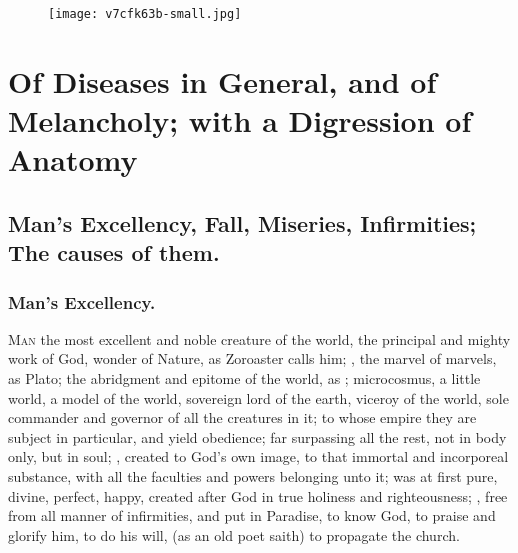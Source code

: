 \cleartoleftpage{}
\begin{figure}[p]
  \begingroup
  \centering
  \texttt{[image: v7cfk63b-small.jpg]}
  \label{fig:deathlooms}
\end{figure}
\clearpage{}
\chapter[Of Diseases and Melancholy]{Of Diseases in General, and of Melancholy; with a Digression of Anatomy}
{%
\section[Man's Excellency, Fall, Miseries]{Man's Excellency, Fall, Miseries, Infirmities; The causes of them.}

\subsection{Man's Excellency.}
\lettrine[lines=4,findent=5pt,nindent=0pt]{M}{an} the most excellent and noble creature of the world, the principal and mighty work of God, wonder of Nature, 
as Zoroaster calls him; , the marvel of marvels,
as Plato; the abridgment and epitome of the world,
as \Pliny{}; microcosmus, a little world, a model of the world, sovereign lord of the earth, viceroy of the world, sole commander and governor of all the creatures in it; to whose empire they are subject in particular, and yield obedience; far surpassing all the rest, not in body only, but in soul; , created to God's own image, to that immortal and incorporeal substance, with all the faculties and powers belonging unto it; was at first pure, divine, perfect, happy, created after God in true holiness and righteousness; , free from all manner of infirmities, and put in Paradise, to know God, to praise and glorify him, to do his will,  (as an old poet saith) to propagate the church.

}
